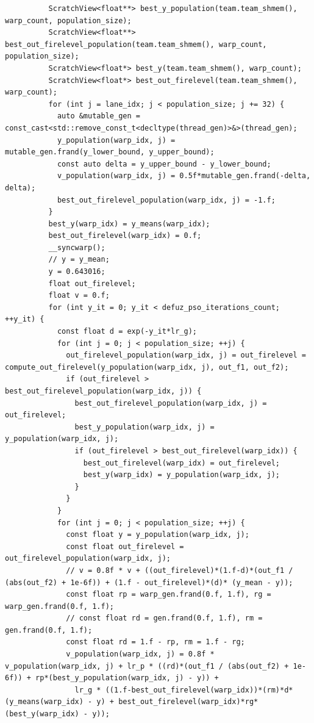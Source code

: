 \begin{verbatim}
          ScratchView<float**> best_y_population(team.team_shmem(), warp_count, population_size);
          ScratchView<float**> best_out_firelevel_population(team.team_shmem(), warp_count, population_size);
          ScratchView<float*> best_y(team.team_shmem(), warp_count);
          ScratchView<float*> best_out_firelevel(team.team_shmem(), warp_count);
          for (int j = lane_idx; j < population_size; j += 32) {
            auto &mutable_gen = const_cast<std::remove_const_t<decltype(thread_gen)>&>(thread_gen);
            y_population(warp_idx, j) = mutable_gen.frand(y_lower_bound, y_upper_bound);
            const auto delta = y_upper_bound - y_lower_bound;
            v_population(warp_idx, j) = 0.5f*mutable_gen.frand(-delta, delta);
            best_out_firelevel_population(warp_idx, j) = -1.f;
          }
          best_y(warp_idx) = y_means(warp_idx);
          best_out_firelevel(warp_idx) = 0.f;
          __syncwarp();
          // y = y_mean;
          y = 0.643016;
          float out_firelevel;
          float v = 0.f;
          for (int y_it = 0; y_it < defuz_pso_iterations_count; ++y_it) {
            const float d = exp(-y_it*lr_g);
            for (int j = 0; j < population_size; ++j) {
              out_firelevel_population(warp_idx, j) = out_firelevel = compute_out_firelevel(y_population(warp_idx, j), out_f1, out_f2);
              if (out_firelevel > best_out_firelevel_population(warp_idx, j)) {
                best_out_firelevel_population(warp_idx, j) = out_firelevel;
                best_y_population(warp_idx, j) = y_population(warp_idx, j);
                if (out_firelevel > best_out_firelevel(warp_idx)) {
                  best_out_firelevel(warp_idx) = out_firelevel;
                  best_y(warp_idx) = y_population(warp_idx, j);
                }
              }
            }
            for (int j = 0; j < population_size; ++j) {
              const float y = y_population(warp_idx, j);
              const float out_firelevel = out_firelevel_population(warp_idx, j);
              // v = 0.8f * v + ((out_firelevel)*(1.f-d)*(out_f1 / (abs(out_f2) + 1e-6f)) + (1.f - out_firelevel)*(d)* (y_mean - y));
              const float rp = warp_gen.frand(0.f, 1.f), rg = warp_gen.frand(0.f, 1.f);
              // const float rd = gen.frand(0.f, 1.f), rm = gen.frand(0.f, 1.f);
              const float rd = 1.f - rp, rm = 1.f - rg;
              v_population(warp_idx, j) = 0.8f * v_population(warp_idx, j) + lr_p * ((rd)*(out_f1 / (abs(out_f2) + 1e-6f)) + rp*(best_y_population(warp_idx, j) - y)) +
                lr_g * ((1.f-best_out_firelevel(warp_idx))*(rm)*d*(y_means(warp_idx) - y) + best_out_firelevel(warp_idx)*rg*(best_y(warp_idx) - y));

\end{verbatim}

